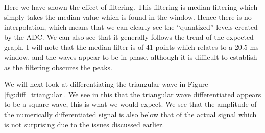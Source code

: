 Here we have shown the effect of filtering. This filtering is median filtering which simply takes the median value which is found in the window. Hence there is no interpolation, which means that we can clearly see the ``quantized'' levels created by the ADC. We can also see that it generally follows the trend of the expected graph. I will note that the median filter is of 41 points which relates to a 20.5 ms window, and the waves appear to be in phase, although it is difficult to establish as the filtering obscures the peaks. \newline

We will next look at differentiating the triangular wave in Figure \ref{fig:diff_triangular}. We see in this that the triangular wave differentiated appears to be a square wave, this is what we would expect. We see that the amplitude of the numerically differentiated signal is also below that of the actual signal which is not surprising due to the issues discussed earlier.

